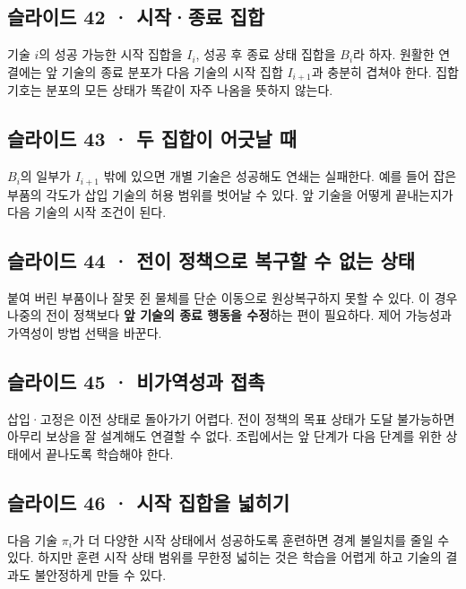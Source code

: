 \documentclass[11pt,a4paper]{article}
\begin{document}
\subsection{슬라이드 42 · 시작·종료 집합}

기술 $i$의 성공 가능한 시작 집합을 $I_i$, 성공 후 종료 상태 집합을 $B_i$라 하자. 원활한 연결에는 앞 기술의 종료 분포가 다음 기술의 시작 집합 $I_{i+1}$과 충분히 겹쳐야 한다. 집합 기호는 분포의 모든 상태가 똑같이 자주 나옴을 뜻하지 않는다.\par

\subsection{슬라이드 43 · 두 집합이 어긋날 때}

$B_i$의 일부가 $I_{i+1}$ 밖에 있으면 개별 기술은 성공해도 연쇄는 실패한다. 예를 들어 잡은 부품의 각도가 삽입 기술의 허용 범위를 벗어날 수 있다. 앞 기술을 어떻게 끝내는지가 다음 기술의 시작 조건이 된다.\par

\subsection{슬라이드 44 · 전이 정책으로 복구할 수 없는 상태}

붙여 버린 부품이나 잘못 쥔 물체를 단순 이동으로 원상복구하지 못할 수 있다. 이 경우 나중의 전이 정책보다 \textbf{앞 기술의 종료 행동을 수정}하는 편이 필요하다. 제어 가능성과 가역성이 방법 선택을 바꾼다.\par

\subsection{슬라이드 45 · 비가역성과 접촉}

삽입·고정은 이전 상태로 돌아가기 어렵다. 전이 정책의 목표 상태가 도달 불가능하면 아무리 보상을 잘 설계해도 연결할 수 없다. 조립에서는 앞 단계가 다음 단계를 위한 상태에서 끝나도록 학습해야 한다.\par

\subsection{슬라이드 46 · 시작 집합을 넓히기}

다음 기술 $\pi_i$가 더 다양한 시작 상태에서 성공하도록 훈련하면 경계 불일치를 줄일 수 있다. 하지만 훈련 시작 상태 범위를 무한정 넓히는 것은 학습을 어렵게 하고 기술의 결과도 불안정하게 만들 수 있다.\par
\end{document}
